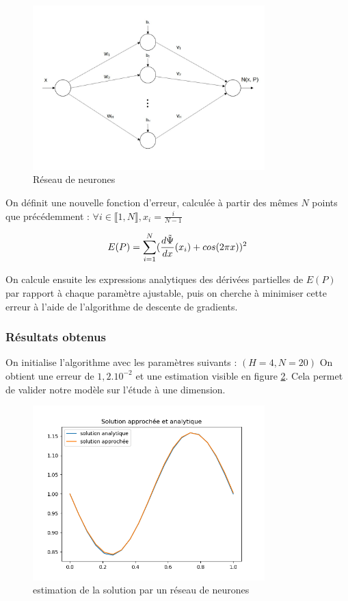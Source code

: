 \documentclass{article}
\begin{document}
\begin{figure}
\centering
\includegraphics[width=0.8\textwidth]{NN.jpg}
\caption{\label{fig:NN}Réseau de neurones}
\end{figure}

On définit une nouvelle fonction d'erreur, calculée à partir des mêmes $N$ points que précédemment : $\forall i \in\llbracket 1,N \rrbracket, x_i = \frac{i}{N-1} $

\begin{equation}
        E(P) = \sum_{i=1}^{N} (\frac{d\Tilde{\Psi}}{dx}(x_i) + cos(2\pi x))^2
\label{eq:erreur NN}
\end{equation}

On calcule ensuite les expressions analytiques des dérivées partielles de $E(P)$ par rapport à chaque paramètre ajustable, puis on cherche à minimiser cette erreur à l'aide de l'algorithme de descente de gradients.

\subsubsection{Résultats obtenus}
On initialise l'algorithme avec les paramètres suivants :
$(H=4, N=20)$
On obtient une erreur de $1,2.10^{-2}$ et une estimation visible en figure \ref{fig:resultat_NN}. Cela permet de valider notre modèle sur l'étude à une dimension.

\begin{figure}
\centering
\includegraphics[width=0.8\textwidth]{resultat_NN.png}
\caption{\label{fig:resultat_NN}estimation de la solution par un réseau de neurones}
\end{figure}
\end{document}
